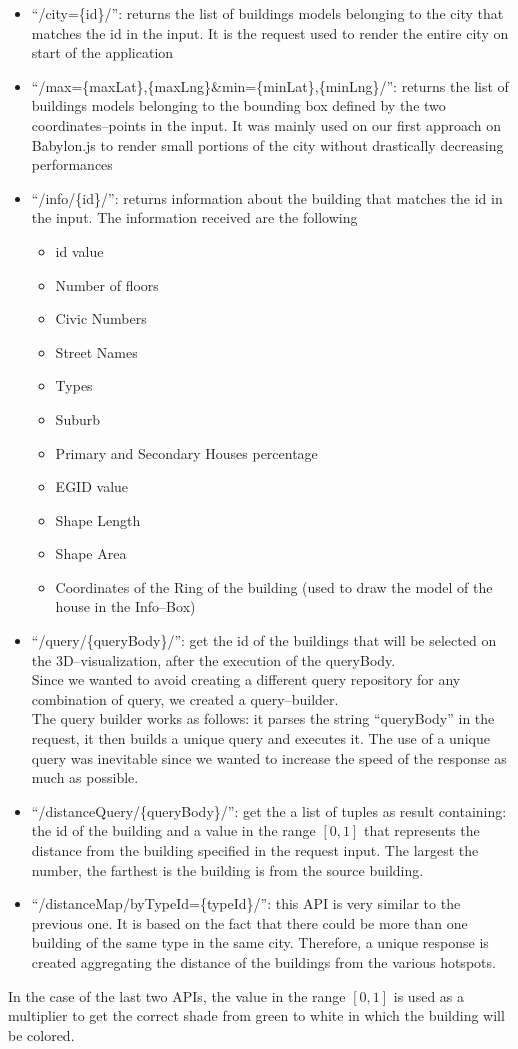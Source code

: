 \begin{itemize}
	\item ``/city=\{id\}/'': returns the list of buildings models belonging to the city that matches the id in the input. It is the request used to render the entire city on start of the application
	\item ``/max=\{maxLat\},\{maxLng\}\&min=\{minLat\},\{minLng\}/'': returns the list of buildings models belonging to the bounding box defined by the two coordinates--points in the input. It was mainly used on our first approach on Babylon.js to render small portions of the city without drastically decreasing performances
	\item ``/info/\{id\}/'': returns information about the building that matches the id in the input. The information received are the following
		\begin{itemize}
			\item id value
			\item Number of floors
			\item Civic Numbers
			\item Street Names
			\item Types
			\item Suburb
			\item Primary and Secondary Houses percentage
			\item EGID value
			\item Shape Length
			\item Shape Area 
			\item Coordinates of the Ring of the building (used to draw the model of the house in the Info--Box)
		\end{itemize}
	\item ``/query/\{queryBody\}/'': get the id of the buildings that will be selected on the 3D--visualization, after the execution of the queryBody.\\ Since we wanted to avoid creating a different query repository for any combination of query, we created a query--builder.\\ The query builder works as follows: it parses the string ``queryBody'' in the request, it then builds a unique query and executes it. The use of a unique query was inevitable since we wanted to increase the speed of the response as much as possible.
	\item ``/distanceQuery/\{queryBody\}/'': get the a list of tuples as result containing: the id of the building and a value in the range $[0,1]$ that represents the distance from the building specified in the request input. The largest the number, the farthest is the building is from the source building.
	\item ``/distanceMap/byTypeId=\{typeId\}/'': this API is very similar to the previous one. It is based on the fact that there could be more than one building of the same type in the same city. Therefore, a unique response is created aggregating the distance of the buildings from the various hotspots.
\end{itemize}
In the case of the last two APIs, the value in the range $[0,1]$ is used as a multiplier to get the correct shade from green to white in which the building will be colored.

